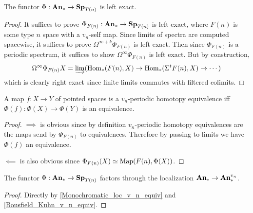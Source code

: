 	\begin{prop}\label{Bousfield_Kuhn_lex}
		The functor $\Phi:\mathbf{An}_*\to\mathbf{Sp}_{T(n)}$ is left exact. 
	\end{prop}
	\begin{proof}
		It suffices to prove $\Phi_{F(n)}:\mathbf{An}_*\to\mathbf{Sp}_{T(n)}$ is left exact, where $F(n)$ is some type $n$ space with a $v_n$-self map. Since limits of spectra are computed spacewise, it suffices to prove $\Omega^{\infty+k}\Phi_{F(n)}$ is left exact. Then since $\Phi_{F(n)}$ is a periodic spectrum, it suffices to show $\Omega^\infty\Phi_{F(n)}$ is left exact. But by construction, 
		\[ \Omega^\infty\Phi_{F(n)}X=\varinjlim(\operatorname{\mathrm{Hom}}_*(F(n),X)\to\operatorname{\mathrm{Hom}}_*(\Sigma^tF(n),X)\to\cdots) \]
		which is clearly right exact since finite limits commutes with filtered colimits. 
	\end{proof}

	\begin{prop}\label{Bousfield_Kuhn_v_n_equiv}
		A map $f:X\to Y$ of pointed spaces is a $v_n$-periodic homotopy equivalence iff $\Phi(f):\Phi(X)\to\Phi(Y)$ is an equivalence. 
	\end{prop}
	\begin{proof}
		$\implies$ is obvious since by definition $v_n$-periodic homotopy equivalences are the maps send by $\Phi_{F(n)}$ to equivalences. Therefore by passing to limits we have $\Phi(f)$ an equivalence. 

		$\impliedby$ is also obvious since $\Phi_{F(n)}(X)\simeq\operatorname{\mathrm{Map}}(F(n),\Phi(X))$. 
	\end{proof}
	
	\begin{coro}\label{Bousfield_Kuhn_source_v_n}
		The functor $\Phi:\mathbf{An}_*\to\mathbf{Sp}_{T(n)}$ factors through the localization $\mathbf{An}_*\to\mathbf{An}_*^{v_n}$. 
	\end{coro}
	\begin{proof}
		Directly by \cref{Monochromatic_loc_v_n_equiv} and \cref{Bousfield_Kuhn_v_n_equiv}. 
	\end{proof}

